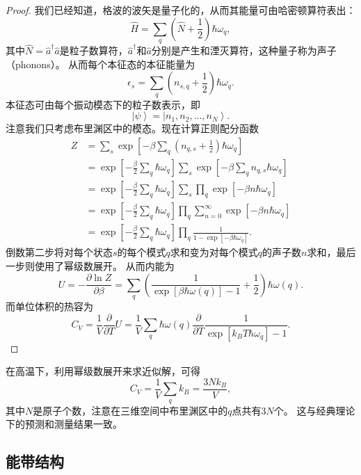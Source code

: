 \begin{proof}
    我们已经知道，格波的波矢是量子化的，从而其能量可由哈密顿算符表出：
    \begin{equation}
        \hat H = \sum_q (\hat N + \frac{1}{2}) \hbar \omega_q,
    \end{equation}
    其中$\hat N = \hat a^\dagger \hat a$是粒子数算符，$\hat a^\dagger$和$\hat a$分别是产生和湮灭算符，这种量子称为声子（phonons）。
    从而每个本征态的本征能量为
    \begin{equation}
        \epsilon_s = \sum_q (n_{s,q} + \frac{1}{2}) \hbar \omega_q.
    \end{equation}
    本征态可由每个振动模态下的粒子数表示，即
    \begin{equation}
        \left| \psi \right> = \left| n_1, n_2, \dots, n_N \right>.
    \end{equation}
    注意我们只考虑布里渊区中的模态。现在计算正则配分函数
    \begin{equation}
        \begin{aligned}
            Z &= \sum_s \exp \left[ -\beta \sum_q (n_{q,s} + \frac{1}{2}) \hbar \omega_q \right] \\
            &= \exp \left[-\frac{\beta}{2} \sum_q \hbar \omega_q\right] \sum_s \exp\left[-\beta \sum_q n_{q,s} \hbar \omega_q\right] \\
            &= \exp \left[-\frac{\beta}{2} \sum_q \hbar \omega_q\right] \sum_s \prod_q \exp \left[ -\beta n \hbar \omega_q \right] \\
            &= \exp \left[-\frac{\beta}{2} \sum_q \hbar \omega_q\right] \prod_q \sum_{n = 0}^{\infty} \exp \left[ -\beta n \hbar \omega_q \right] \\
            & = \exp \left[-\frac{\beta}{2} \sum_q \hbar \omega_q\right] \prod_q \frac{1}{1-\exp[-\beta\hbar\omega_q]}.
        \end{aligned}
    \end{equation}
    倒数第二步将对每个状态$s$的每个模式$q$求和变为对每个模式$q$的声子数$n$求和，最后一步则使用了幂级数展开。
    从而内能为
    \begin{equation}
        U = - \frac{\partial \ln Z}{\partial \beta} = \sum_q \left(\frac{1}{\exp[\beta\hbar\omega(q)]-1} + \frac{1}{2} \right) \hbar \omega(q).
    \end{equation}
    而单位体积的热容为
    \begin{equation}
        C_V = \frac{1}{V} \frac{\partial}{\partial T} U = \frac{1}{V} \sum_q \hbar \omega(q) \frac{\partial}{\partial T} \frac{1}{\exp[k_B T \hbar \omega_q ] - 1}.
    \end{equation}
\end{proof}

在高温下，利用幂级数展开来求近似解，可得
\begin{equation}
    C_V = \frac{1}{V} \sum_q k_B = \frac{3 N k_B}{V},
\end{equation}
其中$N$是原子个数，注意在三维空间中布里渊区中的$q$点共有$3N$个。
这与经典理论下的预测和测量结果一致。


\subsection{能带结构}
